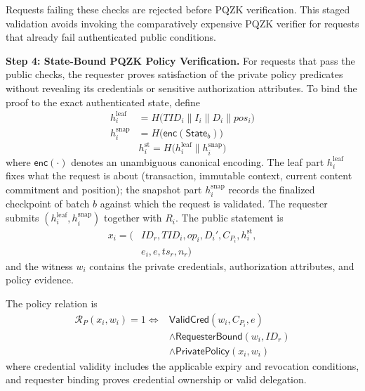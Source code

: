 \documentclass[lettersize,journal]{IEEEtran}
\begin{document}
Requests failing these checks are rejected before PQZK verification.
This staged validation avoids invoking the comparatively expensive
PQZK verifier for requests that already fail authenticated public
conditions.

\medskip
\noindent\textbf{Step 4: State-Bound PQZK Policy Verification.}
For requests that pass the public checks, the requester proves
satisfaction of the private policy predicates without revealing its
credentials or sensitive authorization attributes. To bind the proof
to the exact authenticated state, define
\begin{equation}
\begin{aligned}
h_i^{\mathrm{leaf}} &= H\big(TID_i\parallel I_i\parallel D_i\parallel pos_i\big)\\
h_i^{\mathrm{snap}} &= H\big(\mathsf{enc}(\mathsf{State}_b)\big)
\end{aligned}
\label{eq:hleaf_hsnap}
\end{equation}
\begin{equation}
h_i^{\mathrm{st}}
=
H\big(h_i^{\mathrm{leaf}}\parallel h_i^{\mathrm{snap}}\big)
\end{equation}
where $\mathsf{enc}(\cdot)$ denotes an unambiguous canonical encoding.
The leaf part $h_i^{\mathrm{leaf}}$ fixes what the request
is about (transaction, immutable context, current content commitment and
position); the snapshot part $h_i^{\mathrm{snap}}$ records the finalized
checkpoint of batch $b$ against which the request is validated. The
requester submits $(h_i^{\mathrm{leaf}},h_i^{\mathrm{snap}})$ together
with $R_i$.
The public statement is
\begin{equation}
\begin{aligned}
x_i=\big(&ID_r,TID_i,op_i,D_i',
C_{P_i},h_i^{\mathrm{st}},\\
& e_i,e,ts_r,n_r\big)
\end{aligned}
\label{eq:pqzk_stmt}
\end{equation}
and the witness $w_i$ contains the private credentials,
authorization attributes, and policy evidence.

The policy relation is
\begin{equation}
\begin{aligned}
\mathcal{R}_{P}(x_i,w_i)=1
\iff{}&
\mathsf{ValidCred}(w_i,C_{P_i},e)\\
&\land
\mathsf{RequesterBound}(w_i,ID_r)\\
&\land
\mathsf{PrivatePolicy}(x_i,w_i)
\end{aligned}
\end{equation}
where credential validity includes the applicable expiry and revocation
conditions, and requester binding proves credential ownership or valid
delegation.
\end{document}
